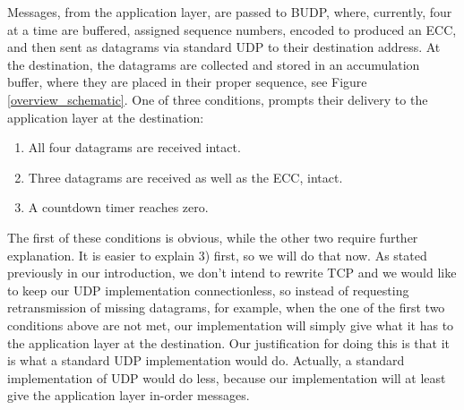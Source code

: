 \documentclass[conference]{IEEEtran}
\theoremstyle{definition}
\begin{document}





Messages, from the application layer, are passed to
BUDP, where, currently, four at a time are buffered,
assigned sequence numbers, encoded to produced an ECC,
and then sent as datagrams via standard UDP to their
destination address. At the destination, the datagrams
are collected and stored in an accumulation buffer,
where they are placed in their proper sequence, see
Figure \ref{overview_schematic}. One of three conditions,
prompts their delivery to the application layer at the
destination:

\begin{enumerate}
 \item All four datagrams are received intact.
 \item Three datagrams are received as well as
       the ECC, intact.
 \item A countdown timer reaches zero.\\
\end{enumerate}

The first of these conditions is obvious, while
the other two require further explanation.  It
is easier to explain 3) first, so we will do
that now.  As stated previously in our introduction,
we don't intend to rewrite TCP and we would like
to keep our UDP implementation connectionless,
so instead of requesting retransmission of
missing datagrams, for example, when the one of
the first two conditions above are not met, our
implementation will simply give what it has to
the application layer at the destination.  Our
justification for doing this is that it is what
a standard UDP implementation would do.  Actually,
a standard implementation of UDP would do less,
because our implementation will at least give the
application layer in-order messages.

\end{document}
